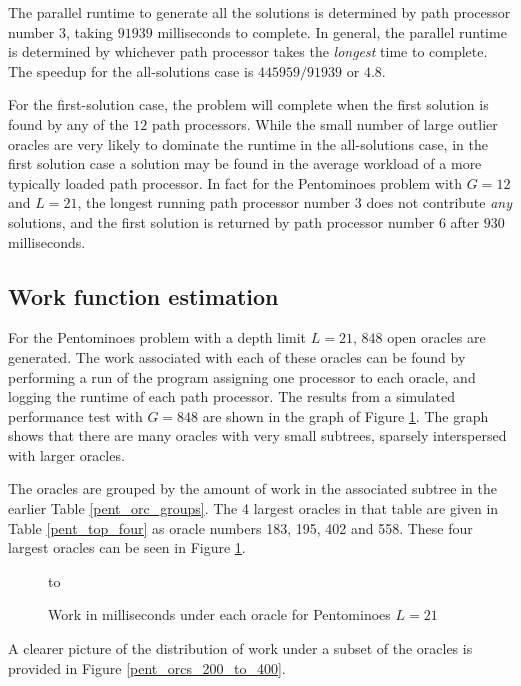 The parallel runtime to generate all the solutions is determined by path processor number $3$,
taking $91939$ milliseconds to complete.  In general, the parallel runtime is determined by 
whichever path processor takes the \textit{longest} time to complete.  The speedup for the 
all-solutions case is $445959/91939$ or $4.8$.

For the first-solution case, the problem will complete when the first solution is found by
any of the $12$ path processors.  While the small number of large outlier oracles
 are very likely to
dominate the runtime in the all-solutions case, in the first solution case a solution may be
found in the average workload of a more typically loaded path processor.  In fact for the
Pentominoes problem with $G=12$ and $L=21$, the longest running
path processor number 3 does not contribute
\textit{any} solutions, and the first solution is returned by path processor number $6$ 
after $930$ milliseconds.

\subsection{Work function estimation}
\label{work_estimation}

For the Pentominoes problem with a depth limit $L=21$, $848$ open oracles are generated.
The work associated with each of these oracles 
can be found by performing a run of the program assigning one processor to
each oracle, and logging the runtime of each path processor.  The results from a
simulated performance test with $G=848$ are shown in the graph of Figure
\ref{pent_orcs}. The graph shows that there are many oracles with very small subtrees,
sparsely interspersed with larger oracles.

The oracles are grouped by the amount of work in the associated
subtree in the earlier Table \ref{pent_orc_groups}. The 4 largest oracles in that
table are given in Table \ref{pent_top_four} as oracle numbers 183, 195, 402 and 558.
These four largest oracles can be seen in Figure \ref{pent_orcs}.

\begin{figure}[htb]
\vspace{5mm} \hbox to 
\caption{Work in milliseconds under each oracle for Pentominoes $L=21$}
\vspace{5mm}
\label{pent_orcs}
\end{figure}

A clearer picture of the distribution of work under a subset of the oracles is provided in
Figure \ref{pent_orcs_200_to_400}.

